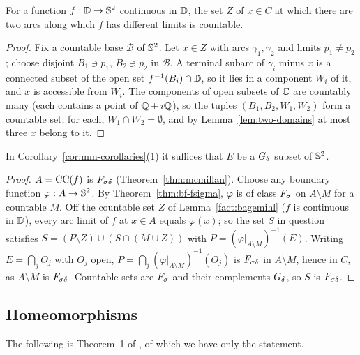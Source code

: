 \begin{lemma}\label{fact:bagemihl}
For a function $f:\mathbb{D}\to\mathbb{S}^2$ continuous in $\mathbb{D}$, the set $Z$ of $x\in C$ at which there are two arcs along which $f$ has
different limits is countable.
\end{lemma}
\begin{proof}
Fix a countable base $\mathcal B$ of $\mathbb{S}^2$. Let $x\in Z$ with arcs $\gamma_1,\gamma_2$ and limits $p_1\ne p_2$; choose disjoint
$B_1\ni p_1$, $B_2\ni p_2$ in $\mathcal B$. A terminal subarc of $\gamma_i$ minus $x$ is a connected subset of the open set
$f^{-1}(B_i)\cap\mathbb{D}$, so it lies in a component $W_i$ of it, and $x$ is accessible from $W_i$. The components of open subsets of $\mathbb{C}$
are countably many (each contains a point of $\mathbb{Q}+i\mathbb{Q}$), so the tuples $(B_1,B_2,W_1,W_2)$ form a countable set; for each, $W_1\cap W_2=\emptyset$,
and by Lemma~\ref{lem:two-domains} at most three $x$ belong to it.
\end{proof}

\begin{proposition}\label{prop:gdelta-remark}
In Corollary~\ref{cor:mm-corollaries}(1) it suffices that $E$ be a $G_\delta$ subset of $\mathbb{S}^2$.
\end{proposition}
\begin{proof}
$A=\operatorname{CC}(f)$ is $F_{\sigma\delta}$ (Theorem~\ref{thm:mcmillan}). Choose any boundary function $\varphi:A\to\mathbb{S}^2$. By
Theorem~\ref{thm:bf-fsigma}, $\varphi$ is of class $F_\sigma$ on $A\setminus M$ for a countable $M$. Off the
countable set $Z$ of Lemma~\ref{fact:bagemihl} ($f$ is continuous in $\mathbb{D}$), every arc limit of $f$ at $x\in A$ equals $\varphi(x)$; so the set
$S$ in question satisfies $S=(P\setminus Z)\cup(S\cap(M\cup Z))$ with $P=(\varphi|_{A\setminus M})^{-1}(E)$. Writing
$E=\bigcap_jO_j$ with $O_j$ open, $P=\bigcap_j(\varphi|_{A\setminus M})^{-1}(O_j)$ is $F_{\sigma\delta}$ in $A\setminus M$, hence in
$C$, as $A\setminus M$ is $F_{\sigma\delta}$. Countable sets are $F_\sigma$ and their complements $G_\delta$, so $S$ is $F_{\sigma\delta}$.
\end{proof}

\subsection{Homeomorphisms}
The following is Theorem~1 of \cite{JMM}, of which we have only the statement.

